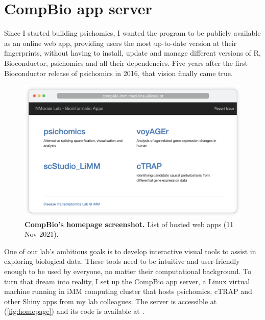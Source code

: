 \chapter{CompBio app server}
\label{chap:app-server}

Since I started building psichomics, I wanted the program to be publicly available as an online web app, providing users the most up-to-date version at their fingerprints, without having to install, update and manage different versions of R, Bioconductor, psichomics and all their dependencies.
Five years after the first Bioconductor release of psichomics in 2016, that vision finally came true.

\begin{figure}[!b]
  \includegraphics[width=.89\textwidth]{images/app-server/homepage}
  \centering
  \caption[Screenshot of CompBio's homepage]{\textbf{CompBio's homepage screenshot.} List of hosted web apps (11 Nov 2021).}
  \label{fig:homepage}
\end{figure}

One of our lab's ambitious goals is to develop interactive visual tools to assist in exploring biological data. These tools need to be intuitive and user-friendly enough to be used by everyone, no matter their computational background. To turn that dream into reality, I set up the CompBio app server, a Linux virtual machine running in iMM computing cluster that hosts psichomics, cTRAP and other Shiny apps from my lab colleagues. The server is accessible at  (\autoref{fig:homepage}) and its code is available at .



